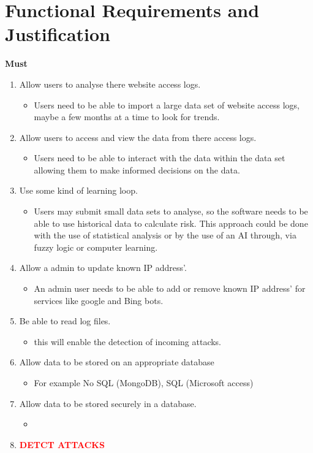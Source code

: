 
\section{Functional Requirements and Justification}
\textbf{Must}
\begin{enumerate}
    \item Allow users to analyse there website access logs.
    \begin{itemize}
        \item Users need to be able to import a large data set of website access logs, maybe a few months at a time to look for trends.
    \end{itemize}
    \item Allow users to access and view the data from there access logs.
    \begin{itemize}
        \item Users need to be able to interact with the data within the data set allowing them to make informed decisions on the data.
    \end{itemize}
    \item Use some kind of learning loop.
    \begin{itemize}
        \item Users may submit small data sets to analyse, so the software needs to be able to use historical data to calculate risk. This approach could be done with the use of statistical analysis or by the use of an AI through, via fuzzy logic or computer learning.
    \end{itemize}
    \item Allow a admin to update known IP address'.
    \begin{itemize}
        \item An admin user needs to be able to add or remove known IP address' for services like google and Bing bots.
    \end{itemize}
    \item Be able to read log files.
    \begin{itemize}
        \item this will enable the detection of incoming attacks.
    \end{itemize}
        \item Allow data to be stored on an appropriate database
    \begin{itemize}
        \item For example  No SQL (MongoDB), SQL (Microsoft access)
    \end{itemize}
        \item Allow data to be stored securely in a database.
    \begin{itemize}
        \item 
    \end{itemize}
    \item\textbf{\textcolor{red}{DETCT ATTACKS}}
\end{enumerate}

